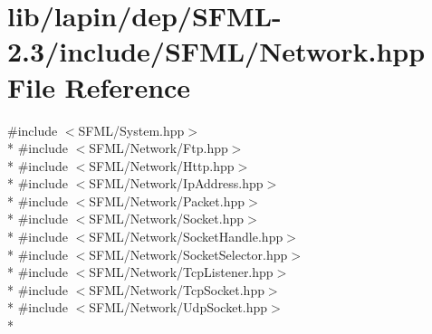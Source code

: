 \hypertarget{lapin_2dep_2_s_f_m_l-2_83_2include_2_s_f_m_l_2_network_8hpp}{\section{lib/lapin/dep/\-S\-F\-M\-L-\/2.3/include/\-S\-F\-M\-L/\-Network.hpp File Reference}
\label{lapin_2dep_2_s_f_m_l-2_83_2include_2_s_f_m_l_2_network_8hpp}
}
{\ttfamily \#include $<$S\-F\-M\-L/\-System.\-hpp$>$}\\*
{\ttfamily \#include $<$S\-F\-M\-L/\-Network/\-Ftp.\-hpp$>$}\\*
{\ttfamily \#include $<$S\-F\-M\-L/\-Network/\-Http.\-hpp$>$}\\*
{\ttfamily \#include $<$S\-F\-M\-L/\-Network/\-Ip\-Address.\-hpp$>$}\\*
{\ttfamily \#include $<$S\-F\-M\-L/\-Network/\-Packet.\-hpp$>$}\\*
{\ttfamily \#include $<$S\-F\-M\-L/\-Network/\-Socket.\-hpp$>$}\\*
{\ttfamily \#include $<$S\-F\-M\-L/\-Network/\-Socket\-Handle.\-hpp$>$}\\*
{\ttfamily \#include $<$S\-F\-M\-L/\-Network/\-Socket\-Selector.\-hpp$>$}\\*
{\ttfamily \#include $<$S\-F\-M\-L/\-Network/\-Tcp\-Listener.\-hpp$>$}\\*
{\ttfamily \#include $<$S\-F\-M\-L/\-Network/\-Tcp\-Socket.\-hpp$>$}\\*
{\ttfamily \#include $<$S\-F\-M\-L/\-Network/\-Udp\-Socket.\-hpp$>$}\\*
